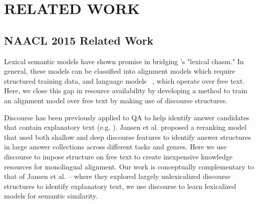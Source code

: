 \chapter{RELATED WORK\label{chapter:related_work}}


\section{NAACL 2015 Related Work}
\label{sec:related_work_naacl2015}


Lexical semantic models have shown promise in bridging \citet{Berger:00}'s "lexical chasm."  In general, these models can be classified into alignment models \citep{echihabi2003noisy,Soricut:06,Riezler:etal:2007,Surdeanu:11,yao2013} which require structured training data, and language models ~\citep{jansen14,sultan-etal:2014:TACL,yih13}, which operate over free text.  Here, we close this gap in resource availability by developing a method to train an alignment model over free text by making use of discourse structures. 

  
  

Discourse has been previously applied to QA to help identify answer candidates that contain explanatory text (e.g. \citet{Verberne:2007}).
Jansen et al. \citeyear{jansen14} proposed a reranking model that used both shallow and deep discourse features to identify answer structures in large answer collections across different tasks and genres.  Here we use discourse to impose structure on free text to create inexpensive knowledge resources for monolingual alignment. Our work is conceptually complementary to that of Jansen et al. -- where they explored largely unlexicalized discourse structures to identify explanatory text, we use discourse to learn lexicalized models for semantic similarity.

